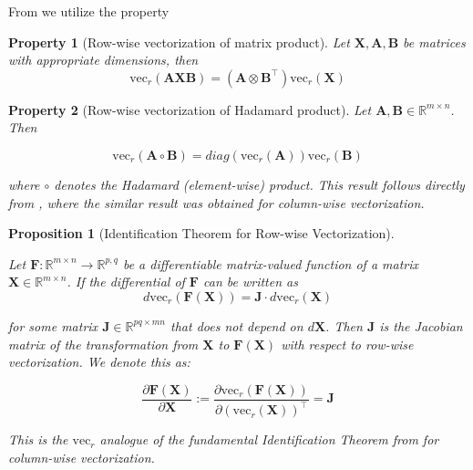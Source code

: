 \documentclass{article}
\newtheorem{proposition}{Proposition}
\newtheorem{property}{Property}
\begin{document}
From \cite{magnus1988matrix} we utilize the property

\begin{property} [Row-wise vectorization of matrix product] \label{prop:vec_r_matrix_product}
    Let $\mathbf{X}, \mathbf{A}, \mathbf{B}$ be matrices with appropriate dimensions, then
    \begin{equation*}
        \mathrm{vec}_r(\mathbf{A} \mathbf{X}\mathbf{B}) = (\mathbf{A} \otimes \mathbf{B}^\top) \mathrm{vec}_r(\mathbf{X})
    \end{equation*}
\end{property}

\begin{property}[Row-wise vectorization of Hadamard product] \label{prop:vec_r_hadamard_product}
Let $\mathbf{A}, \mathbf{B} \in \mathbb{R}^{m \times n}$. Then

\[
\mathrm{vec}_r(\mathbf{A} \circ \mathbf{B}) = \textit{diag}(\mathrm{vec}_r(\mathbf{A})) \mathrm{vec}_r(\mathbf{B})
\]

where $\circ$ denotes the Hadamard (element-wise) product.
This result follows directly from \cite{magnus1988matrix}, where the similar result was obtained for column-wise vectorization. 
\end{property}

\begin{proposition} [Identification Theorem for Row-wise Vectorization] \label{prop:identification_theorem_vec_r}

Let $\mathbf{F}: \mathbb{R}^{m\times n} \rightarrow \mathbb{R}^{p, q}$ be a differentiable matrix-valued function of a matrix $\mathbf{X} \in \mathbb{R}^{m \times n}$. If the differential of $\mathbf{F}$ can be written as \begin{equation*}
d \mathrm{vec}_r(\mathbf{F}(\mathbf{X})) = \mathbf{J} \cdot d \mathrm{vec}_r(\mathbf{X})
\end{equation*}

for some matrix $\mathbf{J} \in \mathbb{R}^{pq \times mn}$ that does not depend on $d\mathbf{X}$. Then $\mathbf{J}$ is the Jacobian matrix of the transformation from $\mathbf{X}$ to $\mathbf{F}(\mathbf{X})$ with respect to row-wise vectorization. We denote this as:

\begin{equation*}
\frac{\partial \mathbf{F}(\mathbf{X})}{\partial \mathbf{X}} := \frac{\partial \mathrm{vec}_r(\mathbf{F}(\mathbf{X}))}{\partial (\mathrm{vec}_r(\mathbf{X}))^\top} = \mathbf{J}
\end{equation*}

This is the $\mathrm{vec}_r$ analogue of the fundamental Identification Theorem from \cite{magnus1988matrix} for column-wise vectorization.
    
\end{proposition}
\end{document}
